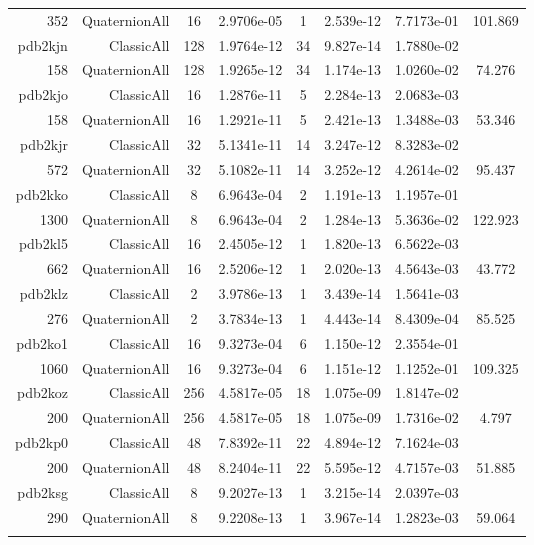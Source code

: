 \begin{xltabular}{\textwidth}{r|rcS[table-format=1.4e+2]cS[table-format=1.3e+2]S[table-format=1.4e+2]S[table-format=-1.3]}
352 & QuaternionAll & 16 & 2.9706e-05 & 1 & 2.539e-12 & 7.7173e-01 & 101.869\\  \addlinespace
pdb2kjn & ClassicAll & 128 & 1.9764e-12 & 34 & 9.827e-14 & 1.7880e-02 & \\
158 & QuaternionAll & 128 & 1.9265e-12 & 34 & 1.174e-13 & 1.0260e-02 & 74.276\\  \addlinespace
pdb2kjo & ClassicAll & 16 & 1.2876e-11 & 5 & 2.284e-13 & 2.0683e-03 & \\
158 & QuaternionAll & 16 & 1.2921e-11 & 5 & 2.421e-13 & 1.3488e-03 & 53.346\\  \addlinespace
pdb2kjr & ClassicAll & 32 & 5.1341e-11 & 14 & 3.247e-12 & 8.3283e-02 & \\
572 & QuaternionAll & 32 & 5.1082e-11 & 14 & 3.252e-12 & 4.2614e-02 & 95.437\\  \addlinespace
pdb2kko & ClassicAll & 8 & 6.9643e-04 & 2 & 1.191e-13 & 1.1957e-01 & \\
1300 & QuaternionAll & 8 & 6.9643e-04 & 2 & 1.284e-13 & 5.3636e-02 & 122.923\\  \addlinespace
pdb2kl5 & ClassicAll & 16 & 2.4505e-12 & 1 & 1.820e-13 & 6.5622e-03 & \\
662 & QuaternionAll & 16 & 2.5206e-12 & 1 & 2.020e-13 & 4.5643e-03 & 43.772\\  \addlinespace
pdb2klz & ClassicAll & 2 & 3.9786e-13 & 1 & 3.439e-14 & 1.5641e-03 & \\
276 & QuaternionAll & 2 & 3.7834e-13 & 1 & 4.443e-14 & 8.4309e-04 & 85.525\\  \addlinespace
pdb2ko1 & ClassicAll & 16 & 9.3273e-04 & 6 & 1.150e-12 & 2.3554e-01 & \\
1060 & QuaternionAll & 16 & 9.3273e-04 & 6 & 1.151e-12 & 1.1252e-01 & 109.325\\  \addlinespace
pdb2koz & ClassicAll & 256 & 4.5817e-05 & 18 & 1.075e-09 & 1.8147e-02 & \\
200 & QuaternionAll & 256 & 4.5817e-05 & 18 & 1.075e-09 & 1.7316e-02 & 4.797\\  \addlinespace
pdb2kp0 & ClassicAll & 48 & 7.8392e-11 & 22 & 4.894e-12 & 7.1624e-03 & \\
200 & QuaternionAll & 48 & 8.2404e-11 & 22 & 5.595e-12 & 4.7157e-03 & 51.885\\  \addlinespace
pdb2ksg & ClassicAll & 8 & 9.2027e-13 & 1 & 3.215e-14 & 2.0397e-03 & \\
290 & QuaternionAll & 8 & 9.2208e-13 & 1 & 3.967e-14 & 1.2823e-03 & 59.064\\  \addlinespace

\end{xltabular}
